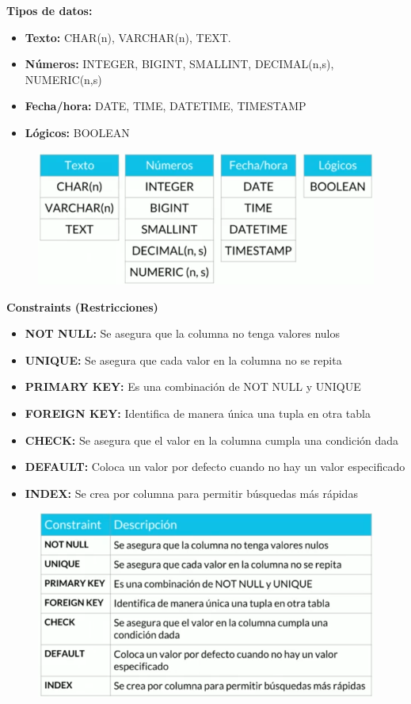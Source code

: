\documentclass{article}
\begin{document}
\textbf{Tipos de datos:}
\begin{itemize}
  \item \textbf{Texto:} CHAR(n), VARCHAR(n), TEXT.
  \item \textbf{Números:} INTEGER, BIGINT, SMALLINT, DECIMAL(n,s), NUMERIC(n,s)
  \item \textbf{Fecha/hora:} DATE, TIME, DATETIME, TIMESTAMP
  \item \textbf{Lógicos:} BOOLEAN
\end{itemize}

\begin{figure}[h!]
    \centering
      \includegraphics[scale=0.45]{./Pictures/020_tipos_datos.png}
\end{figure}

\newpage

\textbf{Constraints (Restricciones)}
\begin{itemize}
  \item \textbf{NOT NULL:} Se asegura que la columna no tenga valores nulos
  \item \textbf{UNIQUE:} Se asegura que cada valor en la columna no se repita
  \item \textbf{PRIMARY KEY:} Es una combinación de NOT NULL y UNIQUE
  \item \textbf{FOREIGN KEY:} Identifica de manera única una tupla en otra tabla
  \item \textbf{CHECK:} Se asegura que el valor en la columna cumpla una condición dada
  \item \textbf{DEFAULT:} Coloca un valor por defecto cuando no hay un valor especificado
  \item \textbf{INDEX:} Se crea por columna para permitir búsquedas más rápidas
\end{itemize}

\begin{figure}[h!]
    \centering
      \includegraphics[scale=0.5]{./Pictures/021_constraints.png}
\end{figure}
\end{document}
